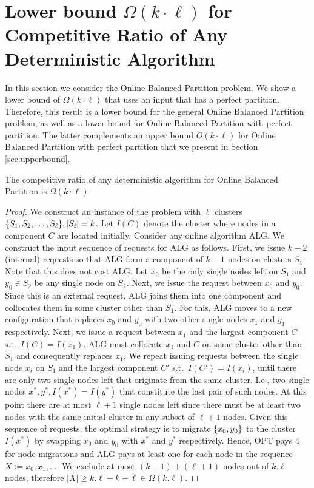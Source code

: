 \documentclass[manuscript,screen=true]{acmart}
\DeclarePairedDelimiter\set{\{}{\}}
\begin{document}
\section{Lower bound $\Omega(k\cdot \ell)$ for Competitive Ratio of Any Deterministic Algorithm}


In this section we consider the Online Balanced Partition problem.
We show a lower bound of $\Omega(k \cdot \ell)$ that uses an input that has a perfect partition.
Therefore, this result is a lower bound for the general Online Balanced Partition problem, as well as a lower bound for Online Balanced Partition with perfect partition.
The latter complements an upper bound $O(k \cdot \ell)$ for Online Balanced Partition with perfect partition that we present in Section \ref{sec:upperbound}.

\begin{theorem}
  The competitive ratio of any deterministic algorithm for Online Balanced Partition is $\Omega(k\cdot \ell)$.
\end{theorem}

\begin{proof}
We construct an instance of the problem with $\ell$ clusters 
$\set{ S_1, S_2,\dots , S_{\ell}}, |S_i|  = k$.
Let $I(C)$ denote the cluster where nodes in a component $C$ are located initially.
Consider any online algorithm ALG.
We construct the input sequence of requests for ALG as follows.
First,
we issue $k-2$ (internal) requests so that ALG form a component of $k-1$
nodes on clusters $S_1$.
Note that this does not cost ALG.
Let $x_0$  be the only single nodes left on $S_1$ and  $y_0 \in S_2$ be any single node on $S_2$.
Next,
we issue the request between $x_0$ and $y_0$.
Since this is an external request,
ALG joins them into one component and collocates them in some cluster other than $S_1$.
For this,
ALG moves to a new configuration that replaces $x_0$ and $y_0$ with two other single nodes $x_1$ and $y_1$ respectively.
Next,
we issue a request between $x_1$ and the largest component $C$ s.t.~$I(C) = I(x_1)$.
ALG must collocate $x_1$ and $C$ on some cluster other than $S_1$ and
consequently replaces $x_1$.
We repeat issuing requests between the single node $x_i$ on $S_1$ and the largest component $C'$ s.t.~$I(C')=I(x_i)$,
 until there are only two single nodes left that  originate from the same cluster.
I.e.,
two single nodes $x^*, y^*,I(x^*) = I(y^*)$
that constitute the last pair of such nodes.
At this point there are at most $\ell+1$ single nodes left
since there must be at least two nodes with the same initial cluster in any subset of $\ell+1$
nodes.
Given this sequence of requests,
the optimal strategy is to migrate $\set{x_0,y_0}$ to the cluster $I(x^*)$ by
 swapping $x_0$ and $y_0$ with $x^*$ and $y^*$ respectively.
Hence,
OPT pays $4$ for node migrations and
ALG pays at least one for each node in the sequence $X := x_0, x_1,\dots$.
We exclude at most $(k-1) + ( \ell+1)$ nodes out of $k.\ell$ nodes,
therefore $|X| \geq k.\ell - k - \ell \in \Omega(k.\ell)$.
\end{proof}
\end{document}
